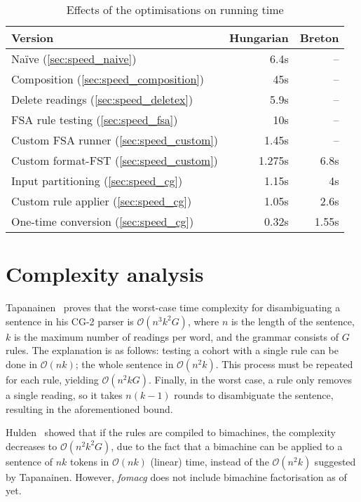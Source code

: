\documentclass[11pt]{article}
\begin{document}
\begin{table}[h]
  \centering
  \caption{Effects of the optimisations on running time}
  \label{tab:evaluation}
  \begin{tabular}{ | l | r | r | }
  \hline
  \textbf{Version} & \textbf{Hungarian} & \textbf{Breton} \\
  \hline
  Naïve (\ref{sec:speed_naive})                 & 6.4s   & -- \\
  Composition (\ref{sec:speed_composition})     & 45s    & -- \\
  Delete readings (\ref{sec:speed_deletex})     & 5.9s   & -- \\
  FSA rule testing (\ref{sec:speed_fsa})        & 10s    & -- \\
  Custom FSA runner (\ref{sec:speed_custom})    & 1.45s  & -- \\
  Custom format-FST (\ref{sec:speed_custom})    & 1.275s & 6.8s \\
  Input partitioning (\ref{sec:speed_cg})       & 1.15s  & 4s \\
  Custom rule applier (\ref{sec:speed_cg})      & 1.05s  & 2.6s \\
  One-time conversion (\ref{sec:speed_cg})      & 0.32s  & 1.55s \\
  \hline
  \end{tabular}
\end{table}

\section{Complexity analysis}
\label{sec:complex}

Tapanainen~ proves that the worst-case time complexity
for disambiguating a sentence in his CG-2 parser is $\mathcal{O}(n^3k^2G)$,
where $n$ is the length of the sentence, $k$ is the maximum number of readings
per word, and the grammar consists of $G$ rules. The explanation is as follows:
testing a cohort with a single rule can be done in $\mathcal{O}(nk)$; 
the whole sentence in $\mathcal{O}(n^2k)$. This process must be repeated for
each rule, yielding $\mathcal{O}(n^2kG)$. Finally, in the worst case, a rule
only removes a single reading, so it takes $n(k - 1)$ rounds to disambiguate the
sentence, resulting in the aforementioned bound.

Hulden~ showed that if the rules are compiled to bimachines,
the complexity decreases to $\mathcal{O}(n^2k^2G)$, due to the fact that a
bimachine can be applied to a sentence of $nk$ tokens in $\mathcal{O}(nk)$
(linear) time, instead of the $\mathcal{O}(n^2k)$ suggested by Tapanainen.
However, \emph{fomacg} does not include bimachine factorisation as of yet.
\end{document}
